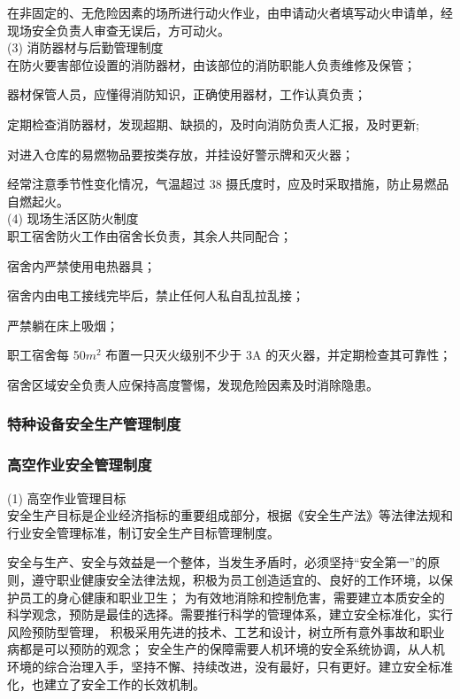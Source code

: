  在非固定的、无危险因素的场所进行动火作业，由申请动火者填写动火申请单，经现场安全负责人审查无误后，方可动火。\\

(3) 消防器材与后勤管理制度\\

 在防火要害部位设置的消防器材，由该部位的消防职能人负责维修及保管；

 器材保管人员，应懂得消防知识，正确使用器材，工作认真负责；

 定期检查消防器材，发现超期、缺损的，及时向消防负责人汇报，及时更新;

 对进入仓库的易燃物品要按类存放，并挂设好警示牌和灭火器；

 经常注意季节性变化情况，气温超过 38 摄氏度时，应及时采取措施，防止易燃品自燃起火。\\

(4) 现场生活区防火制度\\

 职工宿舍防火工作由宿舍长负责，其余人共同配合；

 宿舍内严禁使用电热器具；

 宿舍内由电工接线完毕后，禁止任何人私自乱拉乱接；

 严禁躺在床上吸烟；

 职工宿舍每 50$m^2$ 布置一只灭火级别不少于 3A 的灭火器，并定期检查其可靠性；

 宿舍区域安全负责人应保持高度警惕，发现危险因素及时消除隐患。\\

\subsubsection{特种设备安全生产管理制度}

\subsubsection{高空作业安全管理制度}

(1) 高空作业管理目标\\

安全生产目标是企业经济指标的重要组成部分，根据《安全生产法》等法律法规和行业安全管理标准，制订安全生产目标管理制度。

安全与生产、安全与效益是一个整体，当发生矛盾时，必须坚持“安全第一”的原则，遵守职业健康安全法律法规，积极为员工创造适宜的、良好的工作环境，以保护员工的身心健康和职业卫生；
为有效地消除和控制危害，需要建立本质安全的科学观念，预防是最佳的选择。需要推行科学的管理体系，建立安全标准化，实行风险预防型管理，
积极采用先进的技术、工艺和设计，树立所有意外事故和职业病都是可以预防的观念；
安全生产的保障需要人机环境的安全系统协调，从人机环境的综合治理入手，坚持不懈、持续改进，没有最好，只有更好。建立安全标准化，也建立了安全工作的长效机制。\\

